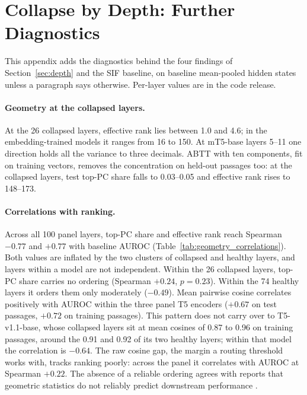 \documentclass[11pt]{article}
\begin{document}
\FloatBarrier
\section{Collapse by Depth: Further Diagnostics}
\label{app:depth_extra}

This appendix adds the diagnostics behind the four findings of Section~\ref{sec:depth} and the SIF baseline, on baseline mean-pooled hidden states unless a paragraph says otherwise.
Per-layer values are in the code release.



\paragraph{Geometry at the collapsed layers.}
At the 26 collapsed layers, effective rank lies between 1.0 and 4.6; in the embedding-trained models it ranges from 16 to 150.
At mT5-base layers 5--11 one direction holds all the variance to three decimals.
ABTT with ten components, fit on training vectors, removes the concentration on held-out passages too: at the collapsed layers, test top-PC share falls to 0.03--0.05 and effective rank rises to 148--173.

\paragraph{Correlations with ranking.}
Across all 100 panel layers, top-PC share and effective rank reach Spearman $-0.77$ and $+0.77$ with baseline AUROC (Table~\ref{tab:geometry_correlations}).
Both values are inflated by the two clusters of collapsed and healthy layers, and layers within a model are not independent.
Within the 26 collapsed layers, top-PC share carries no ordering (Spearman $+0.24$, $p=0.23$).
Within the 74 healthy layers it orders them only moderately ($-0.49$).
Mean pairwise cosine correlates positively with AUROC within the three panel T5 encoders ($+0.67$ on test passages, $+0.72$ on training passages).
This pattern does not carry over to T5-v1.1-base, whose collapsed layers sit at mean cosines of 0.87 to 0.96 on training passages, around the 0.91 and 0.92 of its two healthy layers; within that model the correlation is $-0.64$.
The raw cosine gap, the margin a routing threshold works with, tracks ranking poorly: across the panel it correlates with AUROC at Spearman $+0.22$.
The absence of a reliable ordering agrees with reports that geometric statistics do not reliably predict downstream performance \citep{kulkarni2026geometry,nastase2025geometry}.
\end{document}
